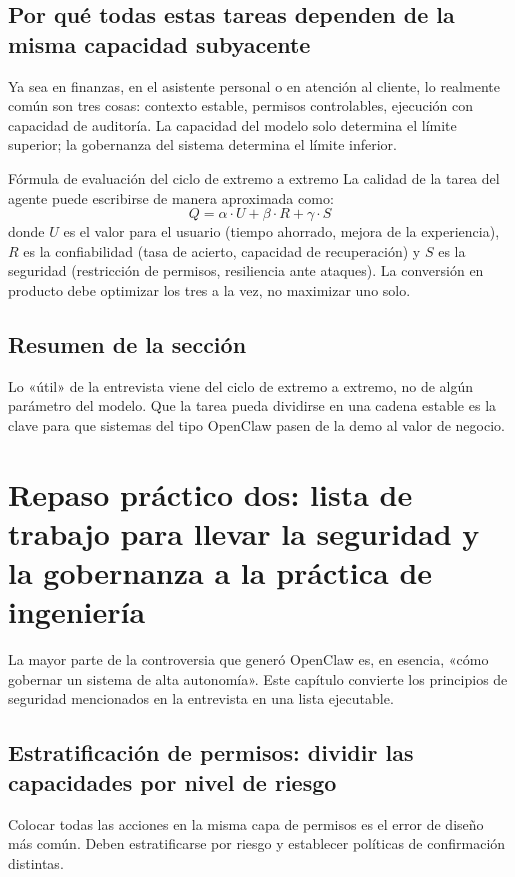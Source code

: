 \documentclass[a4paper]{article}
\begin{document}
\subsection{Por qué todas estas tareas dependen de la misma capacidad subyacente}

Ya sea en finanzas, en el asistente personal o en atención al cliente, lo realmente común son tres cosas: contexto estable, permisos controlables, ejecución con capacidad de auditoría. La capacidad del modelo solo determina el límite superior; la gobernanza del sistema determina el límite inferior.

\begin{importantbox}{Fórmula de evaluación del ciclo de extremo a extremo}
La calidad de la tarea del agente puede escribirse de manera aproximada como:
\[
Q = \alpha \cdot U + \beta \cdot R + \gamma \cdot S
\]
donde \(U\) es el valor para el usuario (tiempo ahorrado, mejora de la experiencia), \(R\) es la confiabilidad (tasa de acierto, capacidad de recuperación) y \(S\) es la seguridad (restricción de permisos, resiliencia ante ataques). La conversión en producto debe optimizar los tres a la vez, no maximizar uno solo.
\end{importantbox}

\subsection{Resumen de la sección}
Lo «útil» de la entrevista viene del ciclo de extremo a extremo, no de algún parámetro del modelo. Que la tarea pueda dividirse en una cadena estable es la clave para que sistemas del tipo OpenClaw pasen de la demo al valor de negocio.
\section{Repaso práctico dos: lista de trabajo para llevar la seguridad y la gobernanza a la práctica de ingeniería}

La mayor parte de la controversia que generó OpenClaw es, en esencia, «cómo gobernar un sistema de alta autonomía». Este capítulo convierte los principios de seguridad mencionados en la entrevista en una lista ejecutable.

\subsection{Estratificación de permisos: dividir las capacidades por nivel de riesgo}

Colocar todas las acciones en la misma capa de permisos es el error de diseño más común. Deben estratificarse por riesgo y establecer políticas de confirmación distintas.
\end{document}
